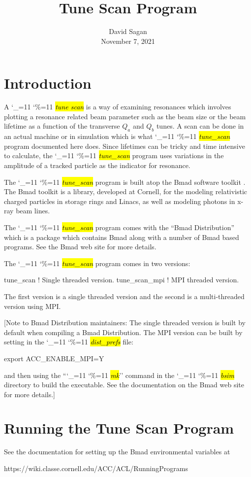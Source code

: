 \documentclass{hitec}
\title{Tune Scan Program}
\author{}
\date{David Sagan \\ November 7, 2021}
\newcommand\dottcmd[1]{\hl{\em#1}\endgroup}
\newcommand{\vn}{\begingroup\catcode`\_=11 \catcode`\%=11 \dottcmd}
\newcommand{\ts}{\vn{tune_scan}\xspace}
\newcommand{\Section}[1]{\section{#1}\vspace*{-1ex}}
\begin{document}
\maketitle

\tableofcontents


\Section{Introduction} 
\label{s:intro}

A \vn{tune scan} is a way of examining resonances which involves plotting a resonance related beam
parameter such as the beam size or the beam lifetime as a function of the transverse $Q_a$ and $Q_b$
tunes.  A scan can be done in an actual machine or in simulation which is what \ts program documented here
does. Since lifetimes can be tricky and time intensive to calculate, the \ts program uses variations in the
amplitude of a tracked particle as the indicator for resonance.

The \ts program is built atop the Bmad software toolkit \cite{b:bmad}. The Bmad toolkit is a
library, developed at Cornell, for the modeling relativistic charged particles in storage rings and
Linacs, as well as modeling photons in x-ray beam lines.

The \ts program comes with the ``Bmad Distribution'' which is a package which contains Bmad along with
a number of Bmad based programs. See the Bmad web site for more details.

The \ts program comes in two versions: 
\begin{code}
tune_scan      ! Single threaded version.
tune_scan_mpi  ! MPI threaded version.
\end{code}
The first version is a single threaded version and the second is a multi-threaded version using MPI.

[Note to Bmad Distribution maintainers: The single threaded version is built by default when compiling a Bmad
Distribution. The MPI version can be built by setting in the \vn{dist_prefs} file:
\begin{code}
  export ACC_ENABLE_MPI=Y
\end{code}
and then using the ``\vn{mk}'' command in the \vn{bsim} directory to build the executable. See the
documentation on the Bmad web site for more details.]

\Section{Running the Tune Scan Program} 
\label{s:run}

See the documentation for setting up the Bmad environmental variables at
\begin{code}
  https://wiki.classe.cornell.edu/ACC/ACL/RunningPrograms
\end{code}
\end{document}
